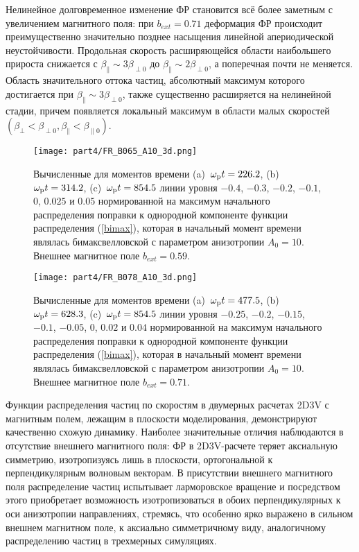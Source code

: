 Нелинейное долговременное изменение ФР становится всё более заметным с увеличением магнитного поля: при $b_{ext}=0.71$ деформация ФР происходит преимущественно значительно позднее насыщения линейной апериодической неустойчивости. Продольная скорость расширяющейся области  наибольшего прироста снижается с $\beta_\|\sim3\beta_{\perp0}$ до $\beta_\|\sim2\beta_{\perp0}$, а поперечная почти не меняется.  Область значительного оттока частиц, абсолютный максимум которого достигается при $\beta_\|\sim3\beta_{\perp0}$,  также существенно расширяется на нелинейной стадии, причем появляется локальный максимум в области малых скоростей $\left(\beta_\perp<\beta_{\perp0},\beta_\|<\beta_{\|0}\right)$.
\begin{figure}[h!]

\texttt{[image: part4/FR\_B065\_A10\_3d.png]}
\caption{Вычисленные для моментов времени (a)~$\omega_\mathrm{p} t = 226.2$, (b)~$\omega_\mathrm{p} t = 314.2$, (c)~$\omega_\mathrm{p} t = 854.5$ линии уровня $-0.4$, $-0.3$, $-0.2$, $-0.1$, $0$, $0.025$ и $0.05$ нормированной на максимум начального распределения поправки к однородной компоненте функции распределения (\ref{bimax}), которая в начальный момент времени являлась бимаксвелловской с параметром анизотропии $A_0=10$. Внешнее магнитное поле $b_{ext}=0.59$.}
\label{ris:FR_A10_3d_B65}
\end{figure}


\begin{figure}[h!]
\texttt{[image: part4/FR\_B078\_A10\_3d.png]}
\caption{Вычисленные для моментов времени (a)~$\omega_\mathrm{p} t = 477.5$, (b)~$\omega_\mathrm{p} t = 628.3$, (c)~$\omega_\mathrm{p} t = 854.5$ линии уровня $-0.25$, $-0.2$, $-0.15$, $-0.1$, $-0.05$, $0$, $0.02$ и $0.04$ нормированной на максимум начального распределения поправки к однородной компоненте функции распределения (\ref{bimax}), которая в начальный момент времени являлась бимаксвелловской с параметром анизотропии $A_0=10$. Внешнее магнитное поле $b_{ext}=0.71$.}
\label{ris:FR_A10_3d_B78}
\end{figure}

Функции распределения частиц по скоростям в двумерных расчетах 2D3V с магнитным полем, лежащим в плоскости моделирования, демонстрируют качественно схожую динамику. Наиболее значительные отличия наблюдаются в отсутствие внешнего магнитного поля:  ФР в 2D3V-расчете теряет аксиальную симметрию, изотропизуясь лишь в плоскости, ортогональной к перпендикулярным волновым векторам. В присутствии внешнего магнитного поля распределение частиц испытывает ларморовское вращение и посредством этого приобретает возможность изотропизоваться в обоих перпендикулярных к оси анизотропии направлениях, стремясь, что особенно ярко выражено в сильном внешнем магнитном поле, к аксиально симметричному виду, аналогичному распределению частиц в трехмерных симуляциях. 


